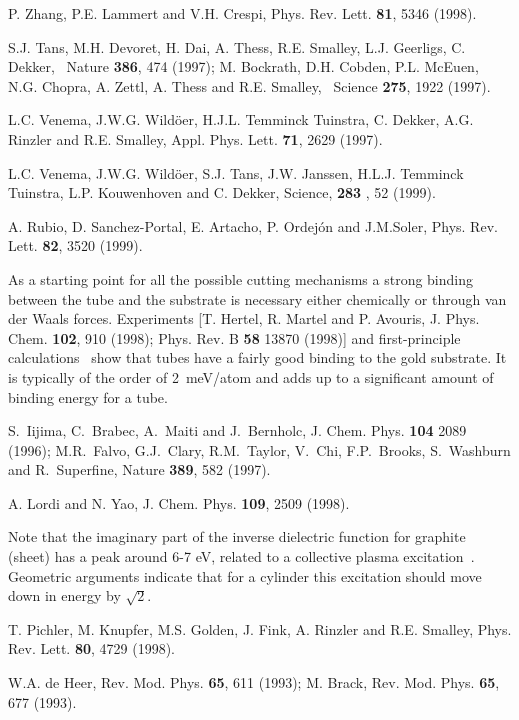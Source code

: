 \begin{multicols}{2}
\begin{thebibliography}{99}
  P. Zhang, P.E. Lammert and V.H. Crespi, Phys. Rev. Lett.
{\bf 81}, 5346 (1998).

  S.J. Tans, M.H. Devoret, H. Dai, A. Thess, R.E. Smalley,
L.J. Geerligs, C. Dekker, {\ Nature} {\bf 386}, 474 (1997); M.
Bockrath, D.H. Cobden, P.L. McEuen, N.G. Chopra, A. Zettl, A.
Thess and R.E. Smalley, {\ Science} {\bf 275}, 1922 (1997).

  L.C. Venema, J.W.G. Wild\"{o}er, H.J.L. Temminck Tuinstra,
C. Dekker, A.G. Rinzler and R.E. Smalley, Appl. Phys. Lett. {\bf 71}, 2629
(1997).

  L.C. Venema, J.W.G. Wild\"{o}er, S.J. Tans, J.W. Janssen,
H.L.J. Temminck Tuinstra, L.P. Kouwenhoven and C. Dekker, Science, {\bf 283}%
, 52 (1999).

  A. Rubio, D. Sanchez-Portal, E. Artacho, P. Ordej\'{o}n and
J.M.Soler, Phys. Rev. Lett. {\bf 82}, 3520 (1999).


 As a starting point for all the possible
cutting mechanisms a strong binding between the tube and the
substrate is necessary either chemically or through van der Waals
forces. Experiments [T. Hertel, R. Martel and P. Avouris, J. Phys.
Chem. {\bf 102}, 910 (1998); Phys. Rev. B {\bf 58} 13870 (1998)]
and first-principle calculations~\cite{Rubio} show that tubes have
a fairly good binding to the gold substrate. It is typically of
the order of 2~meV/atom and adds up to a significant amount of
binding energy for a tube.


S.~Iijima, C.~Brabec, A.~Maiti and J.~Bernholc, J. Chem. Phys.
{\bf 104} 2089 (1996); M.R.~Falvo, G.J.~Clary, R.M.~Taylor,
V.~Chi, F.P.~Brooks, S.~Washburn and R.~Superfine, Nature {\bf
389}, 582 (1997).


 A. Lordi and N. Yao, J. Chem. Phys. {\bf 109}, 2509
(1998).

 Note that the
imaginary part of the inverse dielectric function for graphite
(sheet) has a peak around 6-7 eV, related to a collective plasma
excitation~\cite{book1}. Geometric arguments indicate that for a
cylinder this excitation should move down in energy by $\sqrt{2}$.

  T. Pichler, M. Knupfer, M.S. Golden, J. Fink, A. Rinzler
and R.E. Smalley, Phys. Rev. Lett. {\bf 80}, 4729 (1998).

  W.A. de Heer, Rev. Mod. Phys. {\bf 65}, 611 (1993);
M. Brack, Rev. Mod. Phys. {\bf 65}, 677 (1993).


\end{thebibliography}
\end{multicols}
